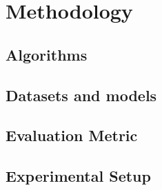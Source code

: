 \chapter{Methodology}

\section{Algorithms}

\section{Datasets and models}

\section{Evaluation Metric}

\section{Experimental Setup}